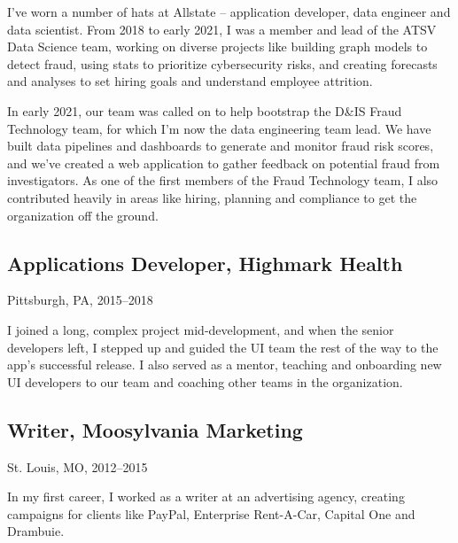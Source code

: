 \documentclass[11pt]{article}
\begin{document}
	\smallskip

	\noindent
	I've worn a number of hats at Allstate -- application developer, data engineer and data scientist. From 2018 to early 2021,
	I was a member and lead of the ATSV Data Science team, working on diverse projects like building graph models to detect fraud,
	using stats to prioritize cybersecurity risks, and creating forecasts and analyses to set hiring goals and understand employee attrition.

	\medskip

	\noindent
	In early 2021, our team was called on to help bootstrap the D\&IS Fraud Technology team,
	for which I'm now the data engineering team lead. We have built data pipelines and dashboards to generate and monitor fraud risk scores, and we've created a web application
	to gather feedback on potential fraud from investigators. As one of the first members of the Fraud Technology team,
	I also contributed heavily in areas like hiring, planning and compliance to get the organization off the ground.  


\subsection{\normalsize{Applications Developer, Highmark Health}}
		{\fontsize{10pt}{\parskip}\selectfont Pittsburgh, PA, 2015--2018}

		\smallskip

		\noindent
	  I joined a long, complex project mid-development, and when the senior developers left, I stepped up and guided the UI team the rest of the way
		to the app's successful release. I also served as a mentor, teaching and onboarding new UI developers to our team and coaching other teams
		in the organization.


\subsection{\normalsize{Writer, Moosylvania Marketing}}
	{\fontsize{10pt}{\parskip}\selectfont St. Louis, MO, 2012--2015}

	\smallskip

	\noindent
	In my first career, I worked as a writer at an advertising agency, creating campaigns for clients like PayPal, Enterprise Rent-A-Car, Capital One and Drambuie.
\end{document}
